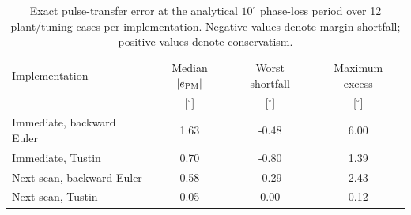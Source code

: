 \begin{table}[pos=!htb]
\centering
\caption{Exact pulse-transfer error at the analytical $10^\circ$ phase-loss
period over 12 plant/tuning cases per implementation. Negative values denote
margin shortfall; positive values denote conservatism.}
\label{tab:benchmark-aggregate}
\small
\setlength{\tabcolsep}{5pt}
\begin{tabular}{@{}lccc@{}}
\toprule
Implementation & Median $|e_{\rm PM}|$ & Worst shortfall & Maximum excess\\
 & [$^\circ$] & [$^\circ$] & [$^\circ$]\\
\midrule
Immediate, backward Euler & 1.63 & -0.48 & 6.00\\
Immediate, Tustin & 0.70 & -0.80 & 1.39\\
Next scan, backward Euler & 0.58 & -0.29 & 2.43\\
Next scan, Tustin & 0.05 & 0.00 & 0.12\\
\bottomrule
\end{tabular}
\end{table}
